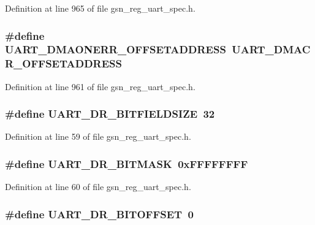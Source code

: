 Definition at line 965 of file gsn\_\-reg\_\-uart\_\-spec.h.

\hypertarget{a00575_a377608baaa4c133e03a4f758f385db2a}{
\subsubsection[{UART\_\-DMAONERR\_\-OFFSETADDRESS}]{\setlength{\rightskip}{0pt plus 5cm}\#define UART\_\-DMAONERR\_\-OFFSETADDRESS~UART\_\-DMACR\_\-OFFSETADDRESS}}
\label{a00575_a377608baaa4c133e03a4f758f385db2a}


Definition at line 961 of file gsn\_\-reg\_\-uart\_\-spec.h.

\hypertarget{a00575_a8d2f0d08577a7ca69ff79c1e642c809a}{
\subsubsection[{UART\_\-DR\_\-BITFIELDSIZE}]{\setlength{\rightskip}{0pt plus 5cm}\#define UART\_\-DR\_\-BITFIELDSIZE~32}}
\label{a00575_a8d2f0d08577a7ca69ff79c1e642c809a}


Definition at line 59 of file gsn\_\-reg\_\-uart\_\-spec.h.

\hypertarget{a00575_afdaa6122fd651437ffa1f254be49fc29}{
\subsubsection[{UART\_\-DR\_\-BITMASK}]{\setlength{\rightskip}{0pt plus 5cm}\#define UART\_\-DR\_\-BITMASK~0xFFFFFFFF}}
\label{a00575_afdaa6122fd651437ffa1f254be49fc29}


Definition at line 60 of file gsn\_\-reg\_\-uart\_\-spec.h.

\hypertarget{a00575_a542a3531f073c82e62f45c6f318e66df}{
\subsubsection[{UART\_\-DR\_\-BITOFFSET}]{\setlength{\rightskip}{0pt plus 5cm}\#define UART\_\-DR\_\-BITOFFSET~0}}
\label{a00575_a542a3531f073c82e62f45c6f318e66df}


